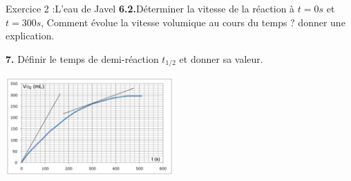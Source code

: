 \documentclass[12pt, french]{article}
\begin{document}
\begin{Box2}{Exercice 2 :L’eau de Javel }
\textbf{6.2.}Déterminer la vitesse de la réaction à $t =0 s$ et $t = 300 s$, Comment évolue la vitesse volumique au cours du temps ? donner une explication.

\textbf{7. }Définir le temps de demi-réaction $t_{1/2}$ et donner sa valeur.
  \begin{center}
	\includegraphics[width=0.48\textwidth]{./img/ex2.png}
  \end{center}
\end{Box2}
\end{document}
